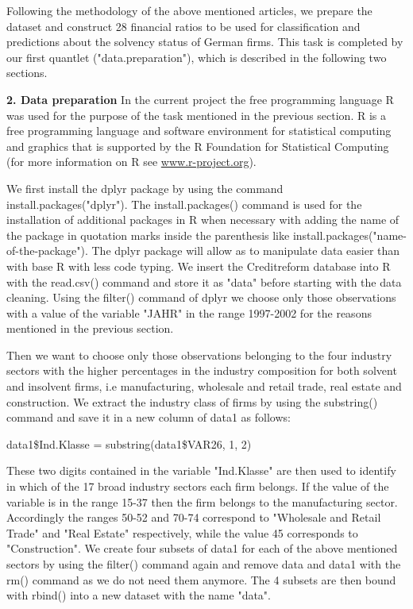 \documentclass[11pt]{article}
\begin{document}
Following the methodology of the above mentioned articles, we prepare the dataset and construct 28 financial ratios to be used for classification and predictions about the solvency status of German firms. This task is completed by our first quantlet ("data.preparation"), which  is described in the following two sections.

\newpage
\textbf{2. Data preparation}
\vskip 0.2in
In the current project the free programming language R was used for the purpose of the task mentioned in the previous section. R is a free programming language and software environment for statistical computing and graphics that is supported by the R Foundation for Statistical Computing (for more information on R see \url{www.r-project.org}).


We first install the dplyr package by using the command install.packages("dplyr"). The install.packages() command is used for the installation of additional packages in R when necessary with adding the name of the package in quotation marks inside the parenthesis like install.packages("name-of-the-package"). The dplyr package will allow as to manipulate data easier than with base R with less code typing. 
We insert the Creditreform database into R with the read.csv() command and store it as "data" before starting with the data cleaning. Using the filter() command  of dplyr we choose only those observations with a value of the variable "JAHR" in the range 1997-2002 for the reasons mentioned in the previous section.

Then we want to choose only those observations belonging to the four industry sectors with the higher percentages in the industry composition for both solvent and insolvent firms, i.e manufacturing, wholesale and retail trade, real estate and construction. We extract the industry class of firms by using the substring() command and save it in a new column of data1 as follows:

data1\$Ind.Klasse = substring(data1\$VAR26, 1, 2)

These two digits contained in the variable "Ind.Klasse" are then used to identify in which of the 17 broad industry sectors each firm belongs. If the value of the variable is in the range 15-37 then the firm belongs to the manufacturing sector. Accordingly the ranges 50-52 and 70-74 correspond to "Wholesale and Retail Trade" and "Real Estate" respectively, while the value 45 corresponds to "Construction". We create four subsets of data1 for each of the above mentioned sectors by using the filter() command again and remove data and data1 with the rm() command as we do not need them anymore. The 4 subsets are then bound with rbind() into a new dataset with the name "data". 
\end{document}
